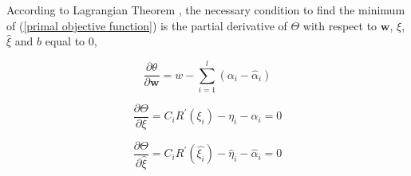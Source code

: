 \documentclass[12pt, draftclsnofoot, onecolumn]{IEEEtran}
\begin{document}
According to Lagrangian Theorem \cite{Introduction to SVM}, the necessary condition to find the minimum of (\ref{primal objective function}) is the partial derivative of $\Theta$ with respect to $\mathbf{w}$, $\xi$, $\hat{\xi}$ and $b$ equal to $0$, 

\begin{equation}
\frac{\partial \theta}{\partial \mathbf{w}}=w-\sum_{i=1}^{l}(\alpha_{i}-\hat{\alpha}_{i})
\label{partial1}
\end{equation}

\begin{equation}
\frac{\partial \Theta}{\partial \xi}=C_{i}R^{'}(\xi_{i})-\eta_{i}-\alpha_{i}=0
\label{partial2}
\end{equation}

\begin{equation}
\frac{\partial \Theta}{\partial \hat{\xi}}=C_{i}R^{'}(\hat{\xi_{i}})-\hat{\eta}_{i}-\hat{\alpha}_{i}=0
\label{partial3}
\end{equation}
\end{document}
